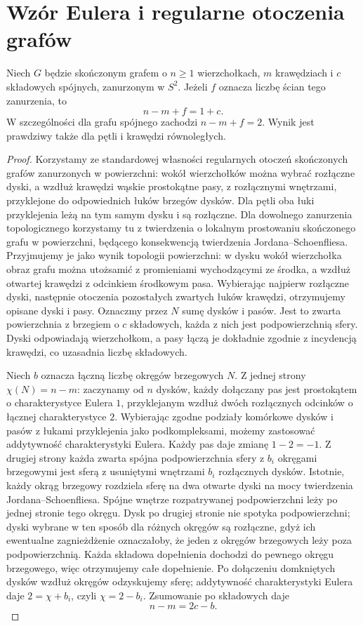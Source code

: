 \section{Wzór Eulera i regularne otoczenia grafów}
\label{sec:tg-planarny-euler}

\begin{twierdzenie}
\label{thm:tg-euler-plane}
Niech $G$ będzie skończonym grafem o $n\ge1$ wierzchołkach,
$m$ krawędziach i $c$ składowych spójnych, zanurzonym w $S^2$.
Jeżeli $f$ oznacza liczbę ścian tego zanurzenia, to
\[
 n-m+f=1+c.
\]
W szczególności dla grafu spójnego zachodzi $n-m+f=2$.
Wynik jest prawdziwy także dla pętli i krawędzi równoległych.
\end{twierdzenie}

\begin{proof}
Korzystamy ze standardowej własności regularnych otoczeń
skończonych grafów zanurzonych w powierzchni: wokół
wierzchołków można wybrać rozłączne dyski, a wzdłuż
krawędzi wąskie prostokątne pasy, z rozłącznymi wnętrzami,
przyklejone do odpowiednich łuków brzegów dysków.
Dla pętli oba łuki przyklejenia leżą na tym samym dysku
i są rozłączne. Dla dowolnego zanurzenia topologicznego korzystamy
tu z twierdzenia o lokalnym prostowaniu skończonego
grafu w powierzchni, będącego konsekwencją twierdzenia
Jordana--Schoenfliesa. Przyjmujemy je jako wynik
topologii powierzchni: w dysku wokół wierzchołka
obraz grafu można utożsamić z promieniami wychodzącymi
ze środka, a wzdłuż otwartej krawędzi z odcinkiem
środkowym pasa. Wybierając najpierw rozłączne dyski,
następnie otoczenia pozostałych zwartych łuków krawędzi,
otrzymujemy opisane dyski i pasy.
Oznaczmy przez $N$ sumę dysków i pasów.
Jest to zwarta powierzchnia z brzegiem o $c$ składowych,
każda z nich jest podpowierzchnią sfery.
Dyski odpowiadają wierzchołkom, a pasy łączą je
dokładnie zgodnie z incydencją krawędzi, co uzasadnia
liczbę składowych.

Niech $b$ oznacza łączną liczbę okręgów brzegowych $N$.
Z jednej strony $\chi(N)=n-m$: zaczynamy od $n$ dysków,
każdy dołączany pas jest prostokątem o charakterystyce
Eulera $1$, przyklejanym wzdłuż dwóch rozłącznych
odcinków o łącznej charakterystyce $2$. Wybierając zgodne podziały komórkowe dysków i pasów
z łukami przyklejenia jako podkompleksami, możemy
zastosować addytywność charakterystyki Eulera.
Każdy pas daje zmianę $1-2=-1$.
Z drugiej strony każda zwarta spójna podpowierzchnia
sfery z $b_i$ okręgami brzegowymi jest sferą z usuniętymi
wnętrzami $b_i$ rozłącznych dysków. Istotnie, każdy
okrąg brzegowy rozdziela sferę na dwa otwarte dyski
na mocy twierdzenia Jordana--Schoenfliesa.
Spójne wnętrze rozpatrywanej podpowierzchni leży
po jednej stronie tego okręgu. Dysk po drugiej
stronie nie spotyka podpowierzchni; dyski wybrane
w ten sposób dla różnych okręgów są rozłączne,
gdyż ich ewentualne zagnieżdżenie oznaczałoby, że
jeden z okręgów brzegowych leży poza podpowierzchnią.
Każda składowa dopełnienia dochodzi do pewnego
okręgu brzegowego, więc otrzymujemy całe dopełnienie.
Po dołączeniu domkniętych dysków wzdłuż okręgów
odzyskujemy sferę; addytywność charakterystyki
Eulera daje $2=\chi+b_i$, czyli $\chi=2-b_i$. Zsumowanie po składowych daje
\[
n-m=2c-b.
\]


\end{proof}
